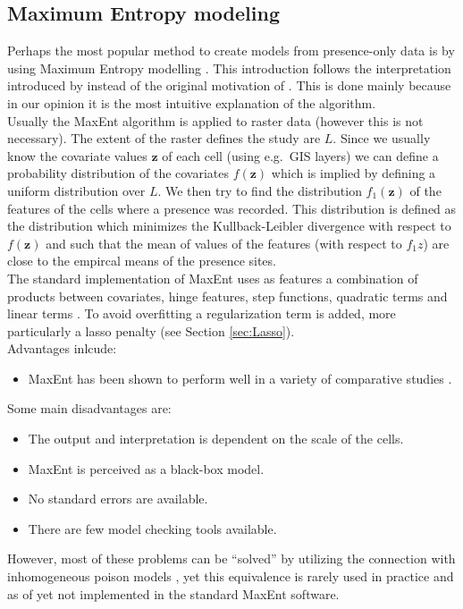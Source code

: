 \subsection{Maximum Entropy modeling}
\label{sec:MaximumEntropyModeling}
Perhaps the most popular method to create models from presence-only data is by using Maximum Entropy modelling \parencite[MaxEnt][]{phillips_maximum_2006,phillips_modeling_2008}. This introduction follows the interpretation introduced by \cite{elith_statistical_2011} instead of the original motivation of \cite{phillips_maximum_2006}. This is done mainly because in our opinion it is the most intuitive explanation of the algorithm. \\

Usually the MaxEnt algorithm is applied to raster data (however this is not necessary). The extent of the raster defines the study are $L$. Since we usually know the covariate values $\bm{z}$ of each cell (using e.g.\ GIS layers) we can define a probability distribution of the covariates $f(\bm{z})$ which is implied by defining a uniform distribution over $L$. We then try to find the distribution $f_1(\bm{z})$ of the features of the cells where a presence was recorded. This distribution is defined as the distribution which minimizes the Kullback-Leibler divergence with respect to $f(\bm{z})$ and such that the mean of values of the features (with respect to $f_1{z}$) are close to the empircal means of the presence sites.\\

The standard implementation of MaxEnt uses as features a combination of products between covariates, hinge features, step functions, quadratic terms and linear terms \parencite{phillips_modeling_2008}. To avoid overfitting a regularization term is added, more particularly a lasso penalty (see Section \ref{sec:Lasso}). \\

Advantages inlcude:
\begin{itemize}

\item MaxEnt has been shown to perform well in a variety of comparative studies \parencite[e.g.][]{elith*_novel_2006}.
\end{itemize}

Some main disadvantages are:
\begin{itemize}
\item The output and interpretation is dependent on the scale of the cells.
\item MaxEnt is perceived as a black-box model.
\item No standard errors are available.
\item There are few model checking tools available.
\end{itemize}
However, most of these problems can be ``solved'' by utilizing the connection with inhomogeneous poison models \parencite[IPP,][]{renner_equivalence_2013,fithian_finite-sample_2013}, yet this equivalence is rarely used in practice and as of yet not implemented in the standard MaxEnt software.

